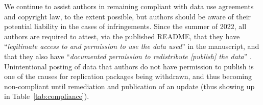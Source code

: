 We continue to assist authors in remaining compliant with data use agreements and copyright law, to the extent possible, but authors should be aware of their potential liability in the cases of infringements. Since the summer of 2022, all authors are required to attest, via the published README, that they have ``\textit{legitimate access to and permission to use the data used}'' in the manuscript, and that they also have ``\textit{documented permission to redistribute [publish] the data}'' \citep[][pg.1]{READMEv1.1.0}. Unintentional posting of data that authors do not have permission to publish is one of the causes for replication packages being withdrawn, and thus becoming non-compliant until remediation and publication of an update (thus showing up in Table~\ref{tab:compliance}).
